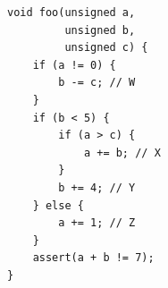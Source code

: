 \documentclass[tikz]{standalone}
\begin{document}
\begin{lrbox}{\coverageCode}
\begin{lstlisting}
void foo(unsigned a,
         unsigned b,
         unsigned c) {
    if (a != 0) {
        b -= c; // W
    }
    if (b < 5) {
        if (a > c) {
            a += b; // X
        }
        b += 4; // Y
    } else {
        a += 1; // Z
    }
    assert(a + b != 7); 
}
\end{lstlisting}
\end{lrbox}





\end{document}
